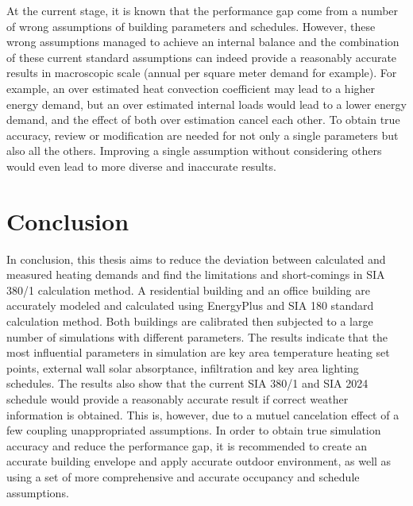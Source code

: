 \documentclass[a4paper, oneside]{discothesis}
\begin{document}
    At the current stage, it is known that the performance gap come from a number of wrong assumptions of building parameters and schedules. However, these wrong assumptions managed to achieve an internal balance and the combination of these current standard assumptions can indeed provide a reasonably accurate results in macroscopic scale (annual per square meter demand for example). For example, an over estimated heat convection coefficient may lead to a higher energy demand, but an over estimated internal loads would lead to a lower energy demand, and the effect of both over estimation cancel each other. To obtain true accuracy, review or modification are needed for not only a single parameters but also all the others. Improving a single assumption without considering others would even lead to more diverse and inaccurate results.\\



\chapter{Conclusion}
    In conclusion, this thesis aims to reduce the deviation between calculated and measured heating demands and find the limitations and short-comings in SIA 380/1 calculation method. A residential building and an office building are accurately modeled and calculated using EnergyPlus and SIA 180 standard calculation method. Both buildings are calibrated then subjected to a large number of simulations with different parameters. The results indicate that the most influential parameters in simulation are key area temperature heating set points, external wall solar absorptance, infiltration and key area lighting schedules. The results also show that the current SIA 380/1 and SIA 2024 schedule would provide a reasonably accurate result if correct weather information is obtained. This is, however, due to a mutuel cancelation effect of a few coupling unappropriated assumptions. In order to obtain true simulation accuracy and reduce the performance gap, it is recommended to create an accurate building envelope and apply accurate outdoor environment, as well as using a set of more comprehensive and accurate occupancy and schedule assumptions.





\end{document}
